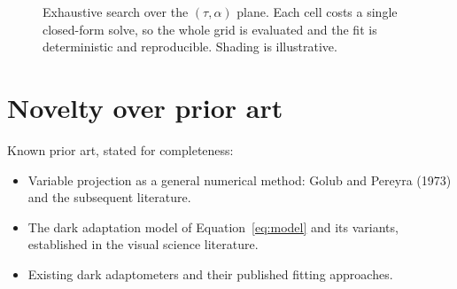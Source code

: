 \documentclass[11pt,a4paper]{article}
\begin{document}
\begin{figure}[ht]
\centering

\caption{Exhaustive search over the $(\tau,\alpha)$ plane. Each cell costs
a single closed-form solve, so the whole grid is evaluated and the fit is
deterministic and reproducible. Shading is illustrative.}
\label{fig:grid}
\end{figure}

\section{Novelty over prior art}
Known prior art, stated for completeness:
\begin{itemize}[nosep]
\item Variable projection as a general numerical method: Golub and
  Pereyra (1973) and the subsequent literature.
\item The dark adaptation model of Equation~\eqref{eq:model} and its
  variants, established in the visual science literature.
\item Existing dark adaptometers and their published fitting approaches.
\end{itemize}
\end{document}
